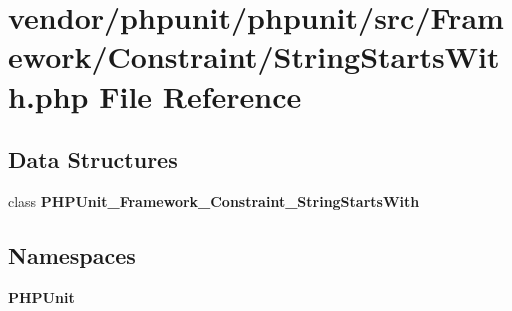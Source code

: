 \section{vendor/phpunit/phpunit/src/\+Framework/\+Constraint/\+String\+Starts\+With.php File Reference}
\label{_string_starts_with_8php}
\subsection*{Data Structures}
\begin{DoxyCompactItemize}
\item 
class {\bf P\+H\+P\+Unit\+\_\+\+Framework\+\_\+\+Constraint\+\_\+\+String\+Starts\+With}
\end{DoxyCompactItemize}
\subsection*{Namespaces}
\begin{DoxyCompactItemize}
\item 
 {\bf P\+H\+P\+Unit}
\end{DoxyCompactItemize}
